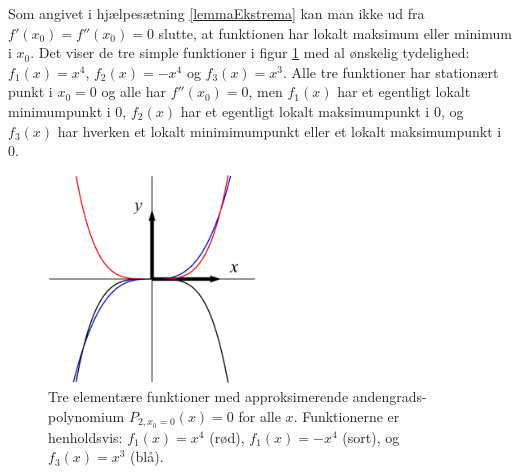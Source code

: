 \begin{example} \label{exampStatPotens}
Som angivet i hjælpesætning \ref{lemmaEkstrema} kan man ikke ud fra $f'(x_{0}) = f''(x_{0}) = 0$ slutte, at funktionen har lokalt maksimum eller minimum i $x_{0}$. Det viser de tre simple funktioner i figur \ref{figStatPotens} med al ønskelig tydelighed: $f_{1}(x) = x^{4}$, $f_{2}(x) = - x^{4}$ og $f_{3}(x) = x^{3}$. Alle tre funktioner har stationært punkt i $x_{0}=0$ og alle har $f''(x_{0})=0$, men $f_{1}(x)$ har et egentligt lokalt minimumpunkt i $0$,  $f_{2}(x)$ har et egentligt lokalt maksimumpunkt i $0$, og $f_{3}(x)$ har hverken et lokalt minimimumpunkt eller et lokalt maksimumpunkt i $0$.
\end{example}

\begin{figure}[ht]
\centerline{ \includegraphics[height=55mm]{plotStatPotens.pdf}}
\begin{center}
\caption{Tre elementære funktioner med approksimerende andengrads-polynomium $P_{2, x_{0}=0}(x)=0$ for alle $x$. Funktionerne er henholdsvis: $f_{1}(x) = x^{4}$ (rød),  $f_{1}(x) = -x^{4}$ (sort), og $f_{3}(x) = x^{3}$ (blå).} \label{figStatPotens}
\end{center}
\end{figure}







